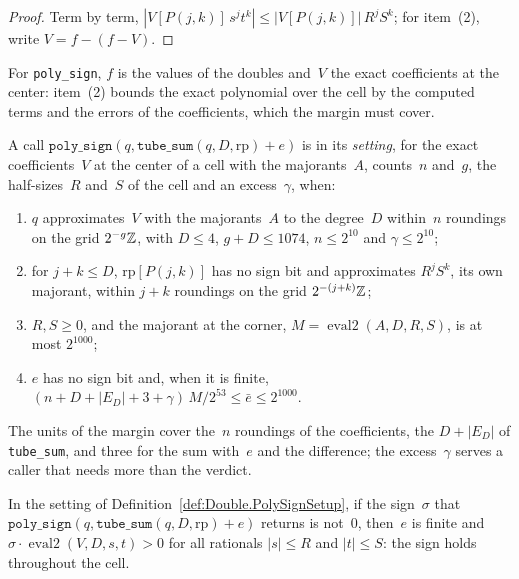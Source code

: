\begin{proof}
  \leanok
  Term by term, $|V[P(j, k)]\, s^j t^k| \le |V[P(j, k)]|\, R^j S^k$; for item~(2), write
  $V = f - (f - V)$.
\end{proof}

For \texttt{poly\_sign}, $f$ is the values of the doubles and~$V$ the exact coefficients at the
center: item~(2) bounds the exact polynomial over the cell by the computed terms and the errors of
the coefficients, which the margin must cover.

\begin{definition}\label{def:Double.PolySignSetup}
  \leanok
  A call $\mathtt{poly\_sign}(q, \mathtt{tube\_sum}(q, D, \mathrm{rp}) + e)$ is in its
  \emph{setting}, for the exact coefficients~$V$ at the center of a cell with the majorants~$A$,
  counts~$n$ and~$g$, the half-sizes~$R$ and~$S$ of the cell and an excess~$\gamma$, when:
  \begin{enumerate}
    \item $q$ approximates~$V$ with the majorants~$A$ to the degree~$D$ within~$n$ roundings on the
      grid $2^{-g}\mathbb{Z}$, with $D \le 4$, $g + D \le 1074$, $n \le 2^{10}$ and $\gamma \le 2^{10}$;
    \item for $j + k \le D$, $\mathrm{rp}[P(j, k)]$ has no sign bit and approximates $R^j S^k$, its
      own majorant, within $j + k$ roundings on the grid $2^{-(j + k)}\mathbb{Z}$;
    \item $R, S \ge 0$, and the majorant at the corner, $M = \operatorname{eval2}(A, D, R, S)$, is
      at most $2^{1000}$;
    \item $e$ has no sign bit and, when it is finite,
      $(n + D + |E_D| + 3 + \gamma)\, M / 2^{53} \le \bar e \le 2^{1000}$.
  \end{enumerate}
\end{definition}

The units of the margin cover the~$n$ roundings of the coefficients, the $D + |E_D|$ of
\texttt{tube\_sum}, and three for the sum with~$e$ and the difference; the excess~$\gamma$ serves a
caller that needs more than the verdict.

\begin{lemma}\label{lem:Double.PolySignSetup.mul_pos_eval2}
  \leanok
  In the setting of Definition~\ref{def:Double.PolySignSetup}, if the sign~$\sigma$ that
  $\mathtt{poly\_sign}(q, \mathtt{tube\_sum}(q, D, \mathrm{rp}) + e)$ returns is not~$0$, then~$e$
  is finite and $\sigma \cdot \operatorname{eval2}(V, D, s, t) > 0$ for all rationals $|s| \le R$
  and $|t| \le S$: the sign holds throughout the cell.
\end{lemma}

